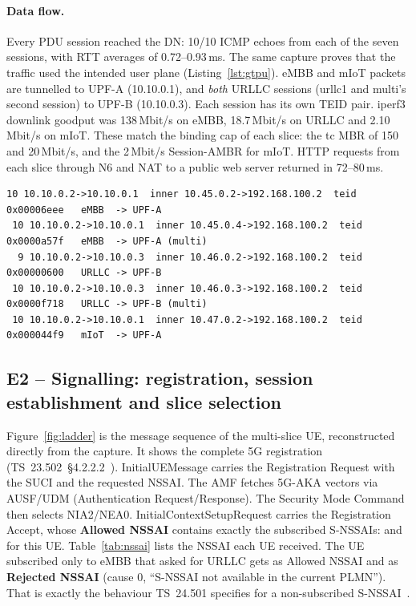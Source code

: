 \paragraph{Data flow.} Every PDU session reached the DN: 10/10 ICMP echoes from each of the
seven sessions, with RTT averages of 0.72--0.93\,ms. The same capture proves that the traffic
used the intended user plane (Listing~\ref{lst:gtpu}). eMBB and mIoT packets are tunnelled
to UPF-A (10.10.0.1), and \emph{both} URLLC sessions (urllc1 and multi's second session) to
UPF-B (10.10.0.3). Each session has its own TEID pair. iperf3 downlink goodput was
138\,Mbit/s on eMBB, 18.7\,Mbit/s on URLLC and 2.10\,Mbit/s on mIoT. These match the binding
cap of each slice: the tc MBR of 150 and 20\,Mbit/s, and the 2\,Mbit/s Session-AMBR for mIoT.
HTTP requests from each slice through N6 and NAT to a public web server returned
 in 72--80\,ms.

\begin{lstlisting}[caption={GTP-U-encapsulated pings per N3 endpoint, outer$\rightarrow$inner
addresses (\code{results/e1/gtpu\_per\_upf.txt}; uplink rows shown).},label={lst:gtpu}]
 10 10.10.0.2->10.10.0.1  inner 10.45.0.2->192.168.100.2  teid 0x00006eee   eMBB  -> UPF-A
 10 10.10.0.2->10.10.0.1  inner 10.45.0.4->192.168.100.2  teid 0x0000a57f   eMBB  -> UPF-A (multi)
  9 10.10.0.2->10.10.0.3  inner 10.46.0.2->192.168.100.2  teid 0x00000600   URLLC -> UPF-B
 10 10.10.0.2->10.10.0.3  inner 10.46.0.3->192.168.100.2  teid 0x0000f718   URLLC -> UPF-B (multi)
 10 10.10.0.2->10.10.0.1  inner 10.47.0.2->192.168.100.2  teid 0x000044f9   mIoT  -> UPF-A
\end{lstlisting}

\subsection{E2 -- Signalling: registration, session establishment and slice selection}\label{sec:e2}
Figure~\ref{fig:ladder} is the message sequence of the multi-slice UE, reconstructed directly
from the capture. It shows the complete 5G registration (TS~23.502~\S4.2.2.2~\cite{ts23502}).
InitialUEMessage carries the Registration Request with the SUCI and the requested NSSAI. The
AMF fetches 5G-AKA vectors via AUSF/UDM (Authentication Request/Response). The Security Mode
Command then selects NIA2/NEA0. InitialContextSetupRequest carries the Registration Accept,
whose \textbf{Allowed NSSAI} contains exactly the subscribed S-NSSAIs:  and
 for this UE.
Table~\ref{tab:nssai} lists the NSSAI each UE received. The UE subscribed only to eMBB that
asked for URLLC gets  as Allowed NSSAI and  as
\textbf{Rejected NSSAI} (cause 0, ``S-NSSAI not available in the current PLMN''). That is
exactly the behaviour TS~24.501 specifies for a non-subscribed S-NSSAI~\cite{ts24501}.

